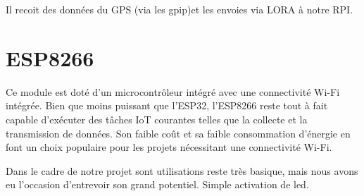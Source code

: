 Il recoit des données du GPS (via les gpip)et les envoies via LORA à notre RPI.
\section{ESP8266}
Ce module est doté d'un microcontrôleur intégré avec une connectivité Wi-Fi intégrée. Bien que moins puissant que l'ESP32, l'ESP8266 reste tout à fait capable d'exécuter des tâches IoT courantes telles que la collecte et la transmission de données. Son faible coût et sa faible consommation d'énergie en font un choix populaire pour les projets nécessitant une connectivité Wi-Fi.

Dans le cadre de notre projet sont utilisations reste très basique, mais nous avons eu l'occasion d'entrevoir son grand potentiel.  Simple activation de led.